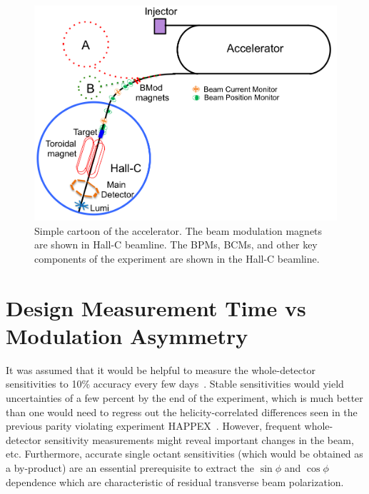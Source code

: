 \begin{singlespace}
\begin{figure}[h]
	\begin{center}
	\includegraphics[width=15.0cm]{figures/BModAcceleratorSketch}
	\end{center}
	\caption
	{Simple cartoon of the accelerator. The beam modulation magnets are shown in Hall-C beamline. The BPMs, BCMs, and other key components of the experiment are shown in the Hall-C beamline. }
	\label{fig:BModAcceleratorSketch}
\end{figure}
\end{singlespace}


\section{Design Measurement Time vs Modulation Asymmetry}
\label{Design Measurement Time vs Modulation Asymmetry}
It was assumed that it would be helpful to measure the whole-detector sensitivities to 10\% accuracy every few days~\cite{mack_communication}. 
Stable sensitivities would yield uncertainties of a few percent by the end of the experiment, which is much better than one would need to regress out the helicity-correlated differences seen in the previous parity violating experiment HAPPEX~\cite{PhysRevLett.98.032301}. However, frequent whole-detector sensitivity measurements might reveal important changes in the beam, etc. Furthermore, accurate single octant sensitivities (which would be obtained as a by-product) are an essential prerequisite to extract the $\sin\phi$ and $\cos\phi$ dependence which are characteristic of residual transverse beam polarization.

